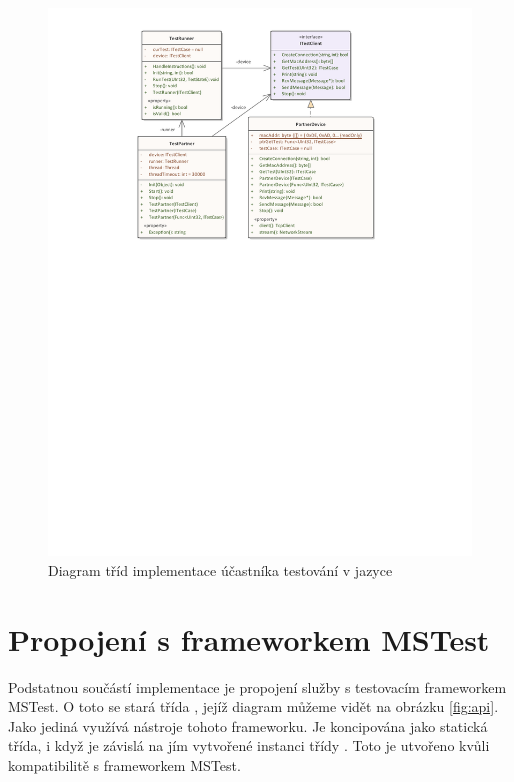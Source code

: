 \begin{figure}[p!]
    \centering 
    \includegraphics[width=\textwidth]{assets/img/class_diagram/client-csharp.pdf}
    \caption{Diagram tříd implementace účastníka testování v jazyce \protect\csharp{}}
    \label{fig:test_client_csharp}
\end{figure}

\clearpage


\section{Propojení s frameworkem MSTest}

Podstatnou součástí implementace je propojení služby s testovacím frameworkem MSTest. O toto se stará třída , jejíž diagram můžeme vidět na obrázku \ref{fig:api}. Jako jediná využívá nástroje tohoto frameworku. Je koncipována jako statická třída, i když je závislá na jím vytvořené instanci třídy . Toto je utvořeno kvůli kompatibilitě s frameworkem MSTest. 

